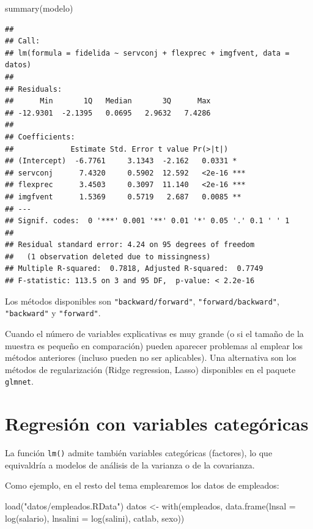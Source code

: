\documentclass[
]{book}
\newenvironment{Shaded}{\begin{snugshade}}{\end{snugshade}}
\newcommand{\AttributeTok}[1]{\textcolor[rgb]{0.77,0.63,0.00}{#1}}
\newcommand{\FunctionTok}[1]{\textcolor[rgb]{0.00,0.00,0.00}{#1}}
\newcommand{\NormalTok}[1]{#1}
\newcommand{\OtherTok}[1]{\textcolor[rgb]{0.56,0.35,0.01}{#1}}
\newcommand{\StringTok}[1]{\textcolor[rgb]{0.31,0.60,0.02}{#1}}
\theoremstyle{break}
\begin{document}
\begin{Shaded}
\begin{Highlighting}[]
\FunctionTok{summary}\NormalTok{(modelo)}
\end{Highlighting}
\end{Shaded}

\begin{verbatim}
## 
## Call:
## lm(formula = fidelida ~ servconj + flexprec + imgfvent, data = datos)
## 
## Residuals:
##      Min       1Q   Median       3Q      Max 
## -12.9301  -2.1395   0.0695   2.9632   7.4286 
## 
## Coefficients:
##             Estimate Std. Error t value Pr(>|t|)    
## (Intercept)  -6.7761     3.1343  -2.162   0.0331 *  
## servconj      7.4320     0.5902  12.592   <2e-16 ***
## flexprec      3.4503     0.3097  11.140   <2e-16 ***
## imgfvent      1.5369     0.5719   2.687   0.0085 ** 
## ---
## Signif. codes:  0 '***' 0.001 '**' 0.01 '*' 0.05 '.' 0.1 ' ' 1
## 
## Residual standard error: 4.24 on 95 degrees of freedom
##   (1 observation deleted due to missingness)
## Multiple R-squared:  0.7818, Adjusted R-squared:  0.7749 
## F-statistic: 113.5 on 3 and 95 DF,  p-value: < 2.2e-16
\end{verbatim}

Los métodos disponibles son \texttt{"backward/forward"}, \texttt{"forward/backward"}, \texttt{"backward"} y \texttt{"forward"}.

Cuando el número de variables explicativas es muy grande (o si el tamaño de la muestra es pequeño en comparación) pueden aparecer problemas al emplear los métodos anteriores (incluso pueden no ser aplicables). Una alternativa son los métodos de regularización (Ridge regression, Lasso) disponibles en el paquete \texttt{glmnet}.

\hypertarget{regresiuxf3n-con-variables-categuxf3ricas}{%
\section{Regresión con variables categóricas}\label{regresiuxf3n-con-variables-categuxf3ricas}}

La función \texttt{lm()} admite también variables categóricas (factores), lo que equivaldría a modelos de análisis de la varianza o de la covarianza.

Como ejemplo, en el resto del tema emplearemos los datos de empleados:

\begin{Shaded}
\begin{Highlighting}[]
\FunctionTok{load}\NormalTok{(}\StringTok{"datos/empleados.RData"}\NormalTok{)}
\NormalTok{datos }\OtherTok{\textless{}{-}} \FunctionTok{with}\NormalTok{(empleados, }\FunctionTok{data.frame}\NormalTok{(}\AttributeTok{lnsal =} \FunctionTok{log}\NormalTok{(salario), }\AttributeTok{lnsalini =} \FunctionTok{log}\NormalTok{(salini), catlab, sexo))}
\end{Highlighting}
\end{Shaded}
\end{document}
